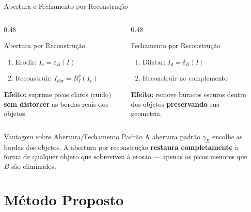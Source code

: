 \documentclass[aspectratio=169,12pt]{beamer}
\begin{document}
\begin{frame}{Abertura e Fechamento por Reconstru\c{c}\~ao}

\begin{columns}[T]
\begin{column}{0.48\textwidth}
\begin{block}{Abertura por Reconstru\c{c}\~ao}
\begin{enumerate}
  \item Erodir: $I_e = \varepsilon_B(I)$
  \item Reconstruir: $I_{\mathrm{obr}} = R^{\delta}_I(I_e)$
\end{enumerate}
\vspace{0.2cm}
\textbf{Efeito:} suprime picos claros (ru\'ido) \textbf{sem distorcer} as bordas reais dos objetos.
\end{block}
\end{column}
\begin{column}{0.48\textwidth}
\begin{block}{Fechamento por Reconstru\c{c}\~ao}
\begin{enumerate}
  \item Dilatar: $I_d = \delta_B(I)$
  \item Reconstruir no complemento
\end{enumerate}
\vspace{0.2cm}
\textbf{Efeito:} remove buracos escuros dentro dos objetos \textbf{preservando} sua geometria.
\end{block}
\end{column}
\end{columns}

\vspace{0.5cm}

\begin{exampleblock}{Vantagem sobre Abertura/Fechamento Padr\~ao}
A abertura padr\~ao $\gamma_B$ encolhe as bordas dos objetos. A abertura por reconstru\c{c}\~ao \textbf{restaura completamente} a forma de qualquer objeto que sobreviveu \`a eros\~ao --- apenas os picos menores que $B$ s\~ao eliminados.
\end{exampleblock}

\end{frame}

\section{M\'etodo Proposto}
\end{document}
